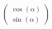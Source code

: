 \documentclass[preview]{standalone}
\begin{document}
\begin{align*}
\begin{pmatrix} \cos(\alpha) \\ \sin(\alpha) \end{pmatrix}
\end{align*}
\end{document}
